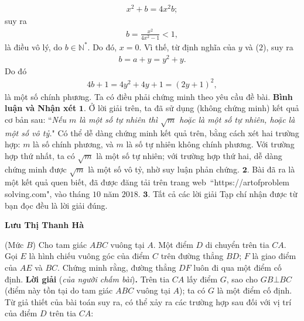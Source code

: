 \begin{multicols}{2}
	\begin{align*}
		{x^2} + b = 4{x^2}b;
	\end{align*}
	suy ra
	\begin{align*}
		b = \frac{{{x^2}}}{{4{x^2} - 1}} < 1,
	\end{align*}
	là điều vô lý, do $b \in \mathbb{N^*}$.
	\vskip 0.05cm 
	Do đó, $x = 0$. Vì thế, từ định nghĩa của $y$ và ($2$), suy ra
	\begin{align*}
		b = a + y = {y^2} + y.
	\end{align*}
	Do đó
	\begin{align*}
		4b + 1 = 4{y^2} + 4y + 1 = {\left( {2y + 1} \right)^2},
	\end{align*}
	là một số chính phương.
	\vskip 0.05cm
	Ta có điều phải chứng minh theo yêu cầu đề bài.
	\vskip 0.05cm
	\textbf{\color{thachthuctoanhoc}Bình luận và Nhận xét}
	\vskip 0.05cm
	$\pmb{1.}$ Ở lời giải trên, ta đã sử dụng (không chứng minh) kết quả cơ bản sau:
	\vskip 0.05cm
	``\textit{Nếu $m$ là một số tự nhiên thì  $\sqrt{m}$ hoặc là một số tự nhiên, hoặc là một số vô tỷ.}"
	\vskip 0.05cm
	Có thể dễ dàng chứng minh kết quả trên, bằng cách xét hai trường hợp: $m$ là số chính phương, và $m$ là số tự nhiên không chính phương. Với trường hợp thứ nhất, ta có $\sqrt{m}$ là một số tự nhiên; với trường hợp thứ hai, dễ dàng chứng minh được  $\sqrt{m}$ là một số vô tỷ, nhờ suy luận phản chứng.
	\vskip 0.05cm
	$\pmb{2.}$ Bài đã ra là một kết quả quen biết, đã được đăng tải trên trang web~``{\small\color{thachthuctoanhoc}https://artofproblem\\solving.com}",
	vào tháng $10$ năm $2018$.
	\vskip 0.05cm
	$\pmb{3.}$ Tất cả các lời giải Tạp chí nhận được từ bạn đọc đều là lời giải đúng.
	\begin{flushright}
		\textbf{\color{thachthuctoanhoc}Lưu Thị Thanh Hà}
	\end{flushright}
	{}
	(Mức $B$) Cho tam giác $ABC$ vuông tại $A$. Một điểm $D$ di chuyển trên tia $CA$. Gọi $E$ là hình chiếu vuông góc của điểm $C$ trên đường thẳng $BD$; $F$ là giao điểm của $AE$ và $BC$. Chứng minh rằng, đường thẳng $DF$ luôn đi qua một điểm cố định.
	\vskip 0.05cm
	\textbf{\color{thachthuctoanhoc}Lời giải} (\textit{của người chấm bài})\textbf{\color{thachthuctoanhoc}.}
	\vskip 0.05cm
	Trên tia $CA$ lấy điểm $G$, sao cho $GB \bot BC$ (điểm này tồn tại do tam giác $ABC$ vuông tại $A$); ta có $G$ là một điểm cố định.
	\vskip 0.05cm
	Từ giả thiết của bài toán suy ra, có thể xảy ra các trường hợp sau đối với vị trí của điểm $D$ trên tia $CA$:

\end{multicols}
